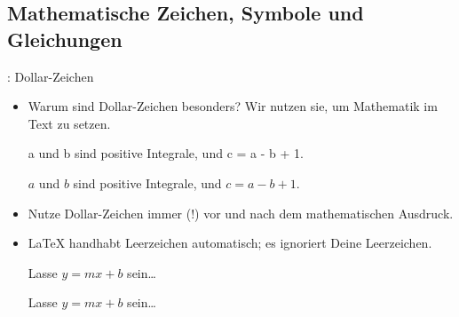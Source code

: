 \documentclass{beamer}
\begin{document}
\subsection{Mathematische Zeichen, Symbole und Gleichungen}
\begin{frame}[fragile]{\insertsubsection{}: Dollar-Zeichen}
\begin{itemize}
\item Warum sind Dollar-Zeichen \keystrokebftt{\$} besonders? Wir nutzen sie, um Mathematik im Text zu setzen.\\[1ex]
\begin{exampletwouptiny}
a und b sind positive Integrale, 
und c = a - b + 1.


$a$ und $b$ sind positive Integrale, 
und $c = a - b + 1$.
\end{exampletwouptiny}
\item Nutze Dollar-Zeichen immer (!) vor und nach dem mathematischen Ausdruck.
\item \LaTeX{} handhabt Leerzeichen automatisch; es ignoriert Deine Leerzeichen.
\begin{exampletwouptiny}
Lasse $y=mx+b$ sein\ldots

Lasse $y = m x + b$ sein\ldots
\end{exampletwouptiny}
\end{itemize}
\end{frame}
\end{document}
